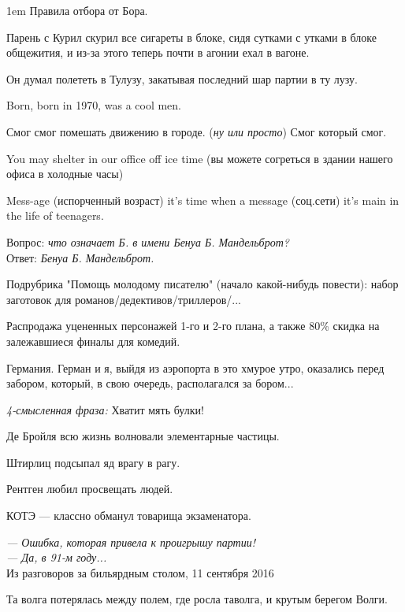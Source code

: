 \begin{flushleft}\parskip1em
Правила отбора от Бора.

Парень с Курил скурил все сигареты в блоке, сидя сутками с утками в блоке общежития, и из-за этого теперь почти в агонии ехал в вагоне.

Он думал полететь в Тулузу, закатывая последний шар партии в ту лузу.

Born, born in 1970, was a cool men.

Смог смог помешать движению в городе. (\emph{ну или просто}) Смог который смог.

You may shelter in our office off ice time (вы можете согреться в здании нашего офиса в холодные часы)

Mess-age (испорченный возраст) it's time when a message (соц.сети) it's main in the life of teenagers.

Вопрос: \emph{что означает Б. в имени Бенуа Б. Мандельброт?}\\
Ответ: \emph{Бенуа Б. Мандельброт.}

Подрубрика "Помощь молодому писателю" (начало какой-нибудь повести): набор заготовок для романов/дедективов/триллеров/...

Распродажа уцененных персонажей 1-го и 2-го плана, а также 80\% скидка на залежавшиеся финалы для комедий.

Германия. Герман и я, выйдя из аэропорта в это хмурое утро, оказались перед забором, который, в свою очередь, располагался за бором...

\emph{4-смысленная фраза:} Хватит мять булки!


Де Бройля всю жизнь волновали элементарные частицы.


Штирлиц подсыпал яд врагу в рагу.


Рентген любил просвещать людей.


КОТЭ --- классно обманул товарища экзаменатора.


\emph{--- Ошибка, которая привела к проигрышу партии!\\
--- Да, в 91-м году...}\\
Из разговоров за бильярдным столом, 11 сентября 2016 


Та волга потерялась между полем, где росла таволга, и крутым берегом Волги. %
\end{flushleft}
